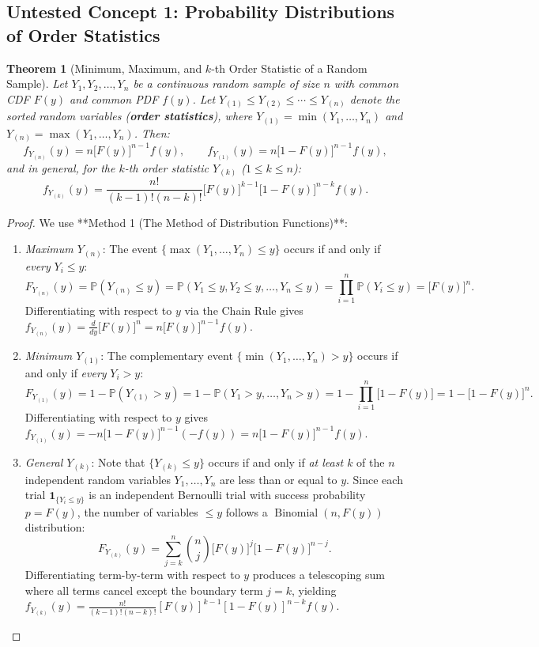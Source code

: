 \documentclass[11pt, letterpaper]{article}
\newtheorem{theorem}{Theorem}[section]
\theoremstyle{definition}
\theoremstyle{remark}
\newcommand{\Prob}{\mathbb{P}}
\begin{document}
\begin{itemize}
\subsection{Untested Concept 1: Probability Distributions of Order Statistics}

\begin{theorem}[Minimum, Maximum, and $k$-th Order Statistic of a Random Sample]
Let $Y_1, Y_2, \dots, Y_n$ be a continuous random sample of size $n$ with common CDF $F(y)$ and common PDF $f(y)$. Let $Y_{(1)} \le Y_{(2)} \le \cdots \le Y_{(n)}$ denote the sorted random variables (\textbf{order statistics}), where $Y_{(1)} = \min(Y_1, \dots, Y_n)$ and $Y_{(n)} = \max(Y_1, \dots, Y_n)$. Then:
\[
    f_{Y_{(n)}}(y) = n \big[F(y)\big]^{n-1} f(y), \qquad f_{Y_{(1)}}(y) = n \big[1 - F(y)\big]^{n-1} f(y),
\]
and in general, for the $k$-th order statistic $Y_{(k)}$ ($1 \le k \le n$):
\[
    f_{Y_{(k)}}(y) = \frac{n!}{(k-1)!(n-k)!} \big[F(y)\big]^{k-1} \big[1 - F(y)\big]^{n-k} f(y).
\]
\end{theorem}

\begin{proof}
We use **Method 1 (The Method of Distribution Functions)**:
\begin{enumerate}[label=\textbf{Step \arabic*:}]
    \item \textit{Maximum $Y_{(n)}$}: The event $\{\max(Y_1, \dots, Y_n) \le y\}$ occurs if and only if \textit{every} $Y_i \le y$:
    \[
        F_{Y_{(n)}}(y) = \Prob(Y_{(n)} \le y) = \Prob(Y_1 \le y, Y_2 \le y, \dots, Y_n \le y) = \prod_{i=1}^n \Prob(Y_i \le y) = \big[F(y)\big]^n.
    \]
    Differentiating with respect to $y$ via the Chain Rule gives $f_{Y_{(n)}}(y) = \frac{d}{dy}\big[F(y)\big]^n = n\big[F(y)\big]^{n-1} f(y)$.
    \item \textit{Minimum $Y_{(1)}$}: The complementary event $\{\min(Y_1, \dots, Y_n) > y\}$ occurs if and only if \textit{every} $Y_i > y$:
    \[
        F_{Y_{(1)}}(y) = 1 - \Prob(Y_{(1)} > y) = 1 - \Prob(Y_1 > y, \dots, Y_n > y) = 1 - \prod_{i=1}^n \big[1 - F(y)\big] = 1 - \big[1 - F(y)\big]^n.
    \]
    Differentiating with respect to $y$ gives $f_{Y_{(1)}}(y) = -n\big[1 - F(y)\big]^{n-1}(-f(y)) = n\big[1 - F(y)\big]^{n-1} f(y)$.
    \item \textit{General $Y_{(k)}$}: Note that $\{Y_{(k)} \le y\}$ occurs if and only if \textit{at least $k$} of the $n$ independent random variables $Y_1, \dots, Y_n$ are less than or equal to $y$. Since each trial $\mathbf{1}_{\{Y_i \le y\}}$ is an independent Bernoulli trial with success probability $p = F(y)$, the number of variables $\le y$ follows a $\operatorname{Binomial}(n, F(y))$ distribution:
    \[
        F_{Y_{(k)}}(y) = \sum_{j=k}^n \binom{n}{j} \big[F(y)\big]^j \big[1 - F(y)\big]^{n-j}.
    \]
    Differentiating term-by-term with respect to $y$ produces a telescoping sum where all terms cancel except the boundary term $j = k$, yielding $f_{Y_{(k)}}(y) = \frac{n!}{(k-1)!(n-k)!}[F(y)]^{k-1}[1-F(y)]^{n-k}f(y)$.
\end{enumerate}
\end{proof}


\end{itemize}
\end{document}
